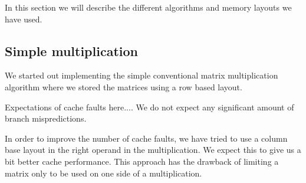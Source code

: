 In this section we will describe the different algorithms and memory
layouts we have used.

\subsection{Simple multiplication}
We started out implementing the simple conventional matrix
multiplication algorithm where we stored the matrices using a row
based layout.

Expectations of cache faults here....
We do not expect any significant amount of branch mispredictions.

In order to improve the number of cache faults, we have tried to use a
column base layout in the right operand in the multiplication. We
expect this to give us a bit better cache performance. This approach
has the drawback of limiting a matrix only to be used on one side of a
multiplication.
